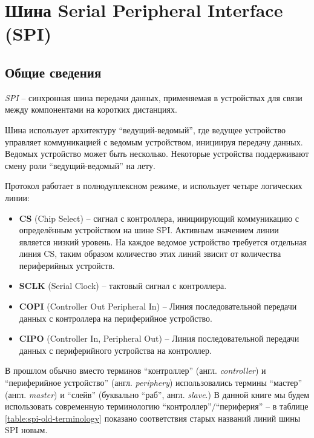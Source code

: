 \documentclass[../sparc.tex]{subfiles}
\begin{document}
\newpage
\section{Шина Serial Peripheral Interface (SPI)}
\label{section:spi}

\subsection{Общие сведения}
\label{section:spi-basics}

\textit{\gls{SPI}} -- синхронная шина передачи данных, применяемая в устройствах
для связи между компонентами на коротких дистанциях.

Шина использует архитектуру ``ведущий-ведомый'', где ведущее устройство
управляет коммуникацией с ведомым устройством, инициируя передачу данных.
Ведомых устройство может быть несколько. Некоторые устройства поддерживают смену
роли ``ведущий-ведомый'' на лету.

Протокол работает в полнодуплексном режиме, и использует
четыре\cite{arduino:spi} логических линии:

\begin{itemize}
\item \textbf{CS} (Chip Select) -- сигнал с контроллера, инициирующий
  коммуникацию с определённым устройством на шине SPI.  Активным значением линии
  является низкий уровень.  На каждое ведомое устройство требуется отдельная
  линия CS, таким образом количество этих линий звисит от количества
  периферийных устройств.
\item \textbf{SCLK} (Serial Clock) -- тактовый сигнал с контроллера.
\item \textbf{COPI} (Controller Out Peripheral In) -- Линия последовательной
  передачи данных с контроллера на периферийное устройство.
\item \textbf{CIPO} (Controller In, Peripheral Out) -- Линия последовательной
  передачи данных с периферийного устройства на контроллер.
\end{itemize}

В прошлом обычно вместо терминов ``контроллер'' (англ. \emph{controller}) и
``периферийное устройство'' (англ. \emph{periphery}) использовались термины
``мастер'' (англ. \emph{master}) и ``слейв'' (буквально ``раб'',
англ. \emph{slave}.)  В данной книге мы будем использовать современную
терминологию ``контроллер''/``периферия'' -- в таблице
\ref{table:spi-old-terminology} показано соответствия старых названий линий шины
SPI новым.
\end{document}
